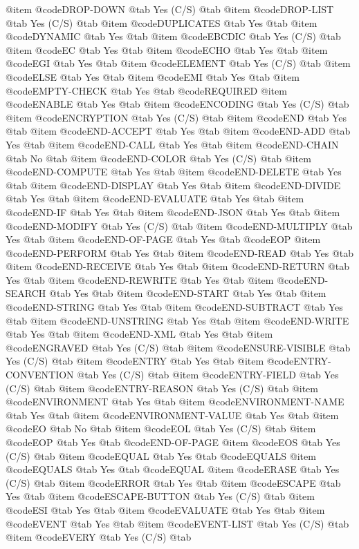 @item @code{DROP-DOWN} @tab Yes	(C/S) @tab
@item @code{DROP-LIST} @tab Yes	(C/S) @tab
@item @code{DUPLICATES} @tab Yes @tab
@item @code{DYNAMIC} @tab Yes @tab
@item @code{EBCDIC} @tab Yes	(C/S) @tab
@item @code{EC} @tab Yes @tab
@item @code{ECHO} @tab Yes @tab
@item @code{EGI} @tab Yes @tab
@item @code{ELEMENT} @tab Yes	(C/S) @tab
@item @code{ELSE} @tab Yes @tab
@item @code{EMI} @tab Yes @tab
@item @code{EMPTY-CHECK} @tab Yes @tab @code{REQUIRED}
@item @code{ENABLE} @tab Yes @tab
@item @code{ENCODING} @tab Yes	(C/S) @tab
@item @code{ENCRYPTION} @tab Yes	(C/S) @tab
@item @code{END} @tab Yes @tab
@item @code{END-ACCEPT} @tab Yes @tab
@item @code{END-ADD} @tab Yes @tab
@item @code{END-CALL} @tab Yes @tab
@item @code{END-CHAIN} @tab No @tab
@item @code{END-COLOR} @tab Yes	(C/S) @tab
@item @code{END-COMPUTE} @tab Yes @tab
@item @code{END-DELETE} @tab Yes @tab
@item @code{END-DISPLAY} @tab Yes @tab
@item @code{END-DIVIDE} @tab Yes @tab
@item @code{END-EVALUATE} @tab Yes @tab
@item @code{END-IF} @tab Yes @tab
@item @code{END-JSON} @tab Yes @tab
@item @code{END-MODIFY} @tab Yes	(C/S) @tab
@item @code{END-MULTIPLY} @tab Yes @tab
@item @code{END-OF-PAGE} @tab Yes @tab @code{EOP}
@item @code{END-PERFORM} @tab Yes @tab
@item @code{END-READ} @tab Yes @tab
@item @code{END-RECEIVE} @tab Yes @tab
@item @code{END-RETURN} @tab Yes @tab
@item @code{END-REWRITE} @tab Yes @tab
@item @code{END-SEARCH} @tab Yes @tab
@item @code{END-START} @tab Yes @tab
@item @code{END-STRING} @tab Yes @tab
@item @code{END-SUBTRACT} @tab Yes @tab
@item @code{END-UNSTRING} @tab Yes @tab
@item @code{END-WRITE} @tab Yes @tab
@item @code{END-XML} @tab Yes @tab
@item @code{ENGRAVED} @tab Yes	(C/S) @tab
@item @code{ENSURE-VISIBLE} @tab Yes	(C/S) @tab
@item @code{ENTRY} @tab Yes @tab
@item @code{ENTRY-CONVENTION} @tab Yes	(C/S) @tab
@item @code{ENTRY-FIELD} @tab Yes	(C/S) @tab
@item @code{ENTRY-REASON} @tab Yes	(C/S) @tab
@item @code{ENVIRONMENT} @tab Yes @tab
@item @code{ENVIRONMENT-NAME} @tab Yes @tab
@item @code{ENVIRONMENT-VALUE} @tab Yes @tab
@item @code{EO} @tab No @tab
@item @code{EOL} @tab Yes	(C/S) @tab
@item @code{EOP} @tab Yes @tab @code{END-OF-PAGE}
@item @code{EOS} @tab Yes	(C/S) @tab
@item @code{EQUAL} @tab Yes @tab @code{EQUALS}
@item @code{EQUALS} @tab Yes @tab @code{EQUAL}
@item @code{ERASE} @tab Yes	(C/S) @tab
@item @code{ERROR} @tab Yes @tab
@item @code{ESCAPE} @tab Yes @tab
@item @code{ESCAPE-BUTTON} @tab Yes	(C/S) @tab
@item @code{ESI} @tab Yes @tab
@item @code{EVALUATE} @tab Yes @tab
@item @code{EVENT} @tab Yes @tab
@item @code{EVENT-LIST} @tab Yes	(C/S) @tab
@item @code{EVERY} @tab Yes	(C/S) @tab
